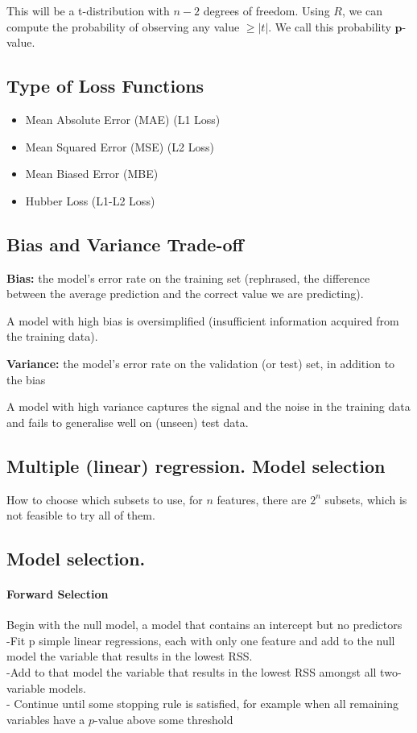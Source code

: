 \documentclass[12pt,a4paper]{article}
\begin{document}
This will be a t-distribution with $n-2$ degrees of freedom.
Using $R$, we can compute the probability of observing any value $\geq|t|$. We call this probability $\mathbf{p}$-value.
\subsection{Type of Loss Functions}
\begin{itemize}
    \item Mean Absolute Error (MAE) (L1 Loss)
    \item Mean Squared Error (MSE) (L2 Loss)
    \item Mean Biased Error (MBE)
    \item Hubber Loss (L1-L2 Loss)
\end{itemize}
\subsection{Bias and Variance Trade-off}
\textbf{Bias:} the model's error rate on the training set (rephrased, the difference between the average prediction and the correct value we are predicting).

A model with high bias is oversimplified (insufficient information acquired from the training data).

\textbf{Variance: }the model's error rate on the validation (or test) set, in addition to the bias

A model with high variance captures the signal and the noise in the training data and fails to generalise well on (unseen) test data.
\subsection{Multiple (linear) regression. Model selection}
How to choose which subsets to use, for $n$ features, there are $2^n$ subsets, which is not feasible to try all of them.
\subsection{Model selection.}
\paragraph{Forward Selection}
Begin with the null model, a model that contains an intercept but no predictors\\
-Fit p simple linear regressions, each with only one feature and add to the null model the variable that results in the lowest RSS.\\
-Add to that model the variable that results in the lowest RSS amongst all two-variable models.\\
- Continue until some stopping rule is satisfied, for example when all remaining variables have a $p$-value above some threshold
\end{document}
